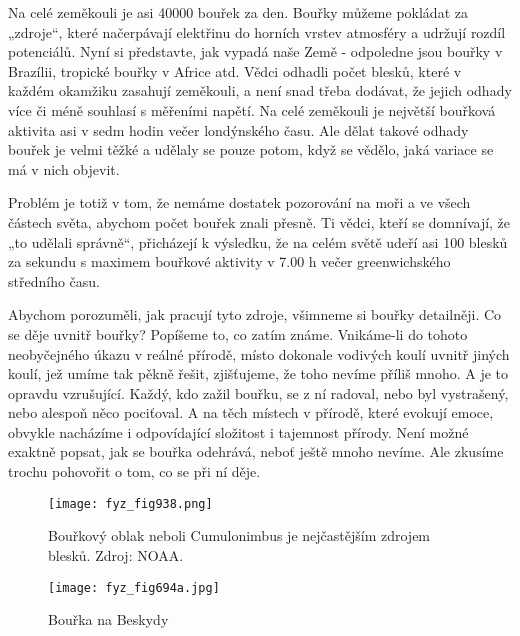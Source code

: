     Na celé zeměkouli je asi \num{40 000} bouřek za den. Bouřky můžeme pokládat za „zdroje“, které
    načerpávají elektřinu do horních vrstev atmosféry a udržují rozdíl potenciálů. Nyní si
    představte, jak vypadá naše Země - odpoledne jsou bouřky v Brazílii, tropické bouřky v Africe
    atd. Vědci odhadli počet blesků, které v každém okamžiku zasahují zeměkouli, a není snad třeba
    dodávat, že jejich odhady více či méně souhlasí s měřeními napětí. Na celé zeměkouli je největší
    bouřková aktivita asi v sedm hodin večer londýnského času. Ale dělat takové odhady bouřek je
    velmi těžké a udělaly se pouze potom, když se vědělo, jaká variace se má v nich objevit.
  
    Problém je totiž v tom, že nemáme dostatek pozorování na moři a ve všech částech světa, abychom
    počet bouřek znali přesně. Ti vědci, kteří se domnívají, že „to udělali správně“, přicházejí k
    výsledku, že na celém světě udeří asi \num{100} blesků za sekundu s maximem bouřkové aktivity v
    7.00 h večer greenwichského středního času.

    Abychom porozuměli, jak pracují tyto zdroje, všimneme si bouřky detailněji. Co se děje uvnitř
    bouřky? Popíšeme to, co zatím známe. Vnikáme-li do tohoto neobyčejného úkazu v reálné přírodě,
    místo dokonale vodivých koulí uvnitř jiných koulí, jež umíme tak pěkně řešit, zjišťujeme, že
    toho nevíme příliš mnoho. A je to opravdu vzrušující. Každý, kdo zažil bouřku, se z ní radoval,
    nebo byl vystrašený, nebo alespoň něco pociťoval. A na těch místech v přírodě, které evokují
    emoce, obvykle nacházíme i odpovídající složitost i tajemnost přírody. Není možné exaktně
    popsat, jak se bouřka odehrává, neboť ještě mnoho nevíme. Ale zkusíme trochu pohovořit o tom, co
    se při ní děje.

    \begin{figure}[ht!] %
      \centering
      \texttt{[image: fyz\_fig938.png]}
      \caption{Bouřkový oblak neboli Cumulonimbus je nejčastějším zdrojem blesků. Zdroj: NOAA.}
      \label{fyz:fig938}
    \end{figure}

    \begin{figure}[ht!] %
      \centering
      \texttt{[image: fyz\_fig694a.jpg]}
      \caption{Bouřka na Beskydy}
      \label{fyz:fig694}
    \end{figure}


